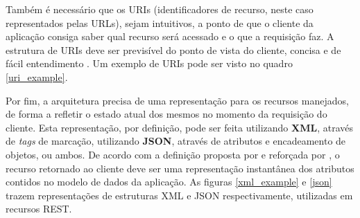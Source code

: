 Também é necessário que os URIs (identificadores de recurso, neste caso representados pelas URLs), sejam intuitivos, a ponto de que o cliente da aplicação consiga saber qual recurso será acessado e o que a requisição faz. A estrutura de URIs deve ser previsível do ponto de vista do cliente, concisa e de fácil entendimento \cite{rodriguez2008restful}. Um exemplo de URIs pode ser visto no quadro \ref{uri_example}.


Por fim, a arquitetura precisa de uma representação para os recursos manejados, de forma a refletir o estado atual dos mesmos no momento da requisição do cliente. Esta representação, por definição, pode ser feita utilizando \textbf{XML}, através de \textit{tags} de marcação, utilizando \textbf{JSON}, através de atributos e encadeamento de objetos, ou ambos. De acordo com a definição proposta por  e reforçada por , o recurso retornado ao cliente deve ser uma representação instantânea dos atributos contidos no modelo de dados da aplicação. As figuras \ref{xml_example} e \ref{json} trazem representações de estruturas XML e JSON respectivamente, utilizadas em recursos REST.

